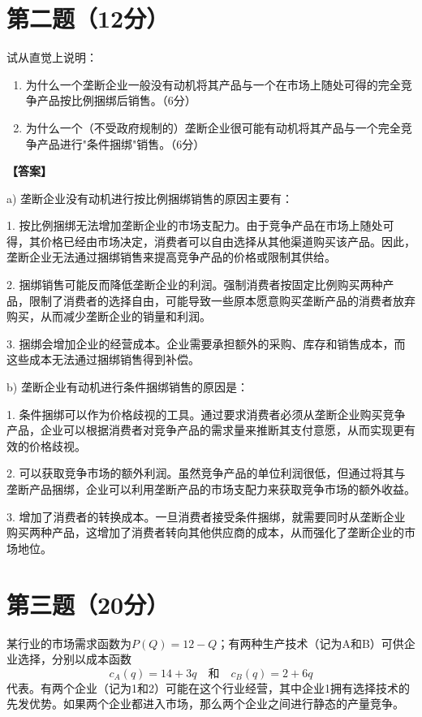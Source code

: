 \documentclass[12pt]{article}
\begin{document}
\section*{第二题（12分）}
试从直觉上说明：

\begin{enumerate}
\item 为什么一个垄断企业一般没有动机将其产品与一个在市场上随处可得的完全竞争产品按比例捆绑后销售。（6分）

\item 为什么一个（不受政府规制的）垄断企业很可能有动机将其产品与一个完全竞争产品进行"条件捆绑"销售。（6分）
\end{enumerate}

\noindent\textbf{【答案】}

a) 垄断企业没有动机进行按比例捆绑销售的原因主要有：

1. 按比例捆绑无法增加垄断企业的市场支配力。由于竞争产品在市场上随处可得，其价格已经由市场决定，消费者可以自由选择从其他渠道购买该产品。因此，垄断企业无法通过捆绑销售来提高竞争产品的价格或限制其供给。

2. 捆绑销售可能反而降低垄断企业的利润。强制消费者按固定比例购买两种产品，限制了消费者的选择自由，可能导致一些原本愿意购买垄断产品的消费者放弃购买，从而减少垄断企业的销量和利润。

3. 捆绑会增加企业的经营成本。企业需要承担额外的采购、库存和销售成本，而这些成本无法通过捆绑销售得到补偿。

b) 垄断企业有动机进行条件捆绑销售的原因是：

1. 条件捆绑可以作为价格歧视的工具。通过要求消费者必须从垄断企业购买竞争产品，企业可以根据消费者对竞争产品的需求量来推断其支付意愿，从而实现更有效的价格歧视。

2. 可以获取竞争市场的额外利润。虽然竞争产品的单位利润很低，但通过将其与垄断产品捆绑，企业可以利用垄断产品的市场支配力来获取竞争市场的额外收益。

3. 增加了消费者的转换成本。一旦消费者接受条件捆绑，就需要同时从垄断企业购买两种产品，这增加了消费者转向其他供应商的成本，从而强化了垄断企业的市场地位。

\section*{第三题（20分）}
某行业的市场需求函数为$P(Q)=12-Q$；有两种生产技术（记为A和B）可供企业选择，分别以成本函数
$$c_A(q)=14+3q\quad\text{和}\quad c_B(q)=2+6q$$
代表。有两个企业（记为1和2）可能在这个行业经营，其中企业1拥有选择技术的先发优势。如果两个企业都进入市场，那么两个企业之间进行静态的产量竞争。
\end{document}

